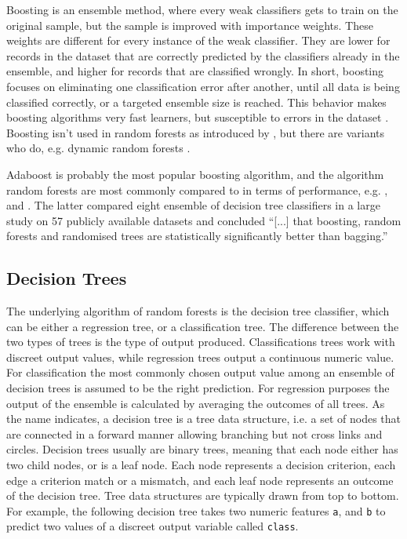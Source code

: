 \documentclass[a4paper,man,12pt,apacite,floatsintext,draftfirst]{apa6} %
\begin{document}
Boosting is an ensemble method, where every weak classifiers gets to train
on the original sample, but the sample is improved with importance weights.
These weights are different for every instance of the weak classifier.
They are lower for records in the dataset that are correctly predicted by
the classifiers already in the ensemble,
and higher for records that are classified wrongly.
In short, boosting focuses on eliminating one classification error after
another, until all data is being classified correctly,
or a targeted ensemble size is reached.
This behavior makes boosting algorithms very fast learners,
but susceptible to errors in the dataset \cite{long2010random}.
Boosting isn't used in random forests as introduced by ,
but there are variants who do, e.g.
dynamic random forests \cite{bernard2012dynamic}.

Adaboost \cite{freund1995decision} is probably the most popular
boosting algorithm, and the algorithm random forests are most commonly
compared to in terms of performance, e.g. ,
 and .
The latter compared eight ensemble of decision tree classifiers in a
large study on 57 publicly available datasets and concluded
“[...] that boosting, random forests and randomised trees are
statistically significantly better than bagging.”

\subsection{Decision Trees}

The underlying algorithm of random forests is the decision tree classifier,
which can be either a regression tree, or a classification tree.
The difference between the two types of trees is the type of output produced.
Classifications trees work with discreet output values,
while regression trees output a continuous numeric value.
For classification the most commonly chosen output value among an ensemble
of decision trees is assumed to be the right prediction.
For regression purposes the output of the ensemble is calculated by averaging
the outcomes of all trees.
As the name indicates, a decision tree is a tree data structure, i.e.
a set of nodes that are connected in a forward manner allowing branching
but not cross links and circles.
Decision trees usually are binary trees, meaning that each node either has
two child nodes, or is a leaf node.
Each node represents a decision criterion, each edge a criterion match or
a mismatch, and each leaf node represents an outcome of the decision tree.
Tree data structures are typically drawn from top to bottom.
For example, the following decision tree takes two numeric features
\texttt{a}, and \texttt{b} to predict two values of a discreet output variable
called \texttt{class}.
\end{document}
